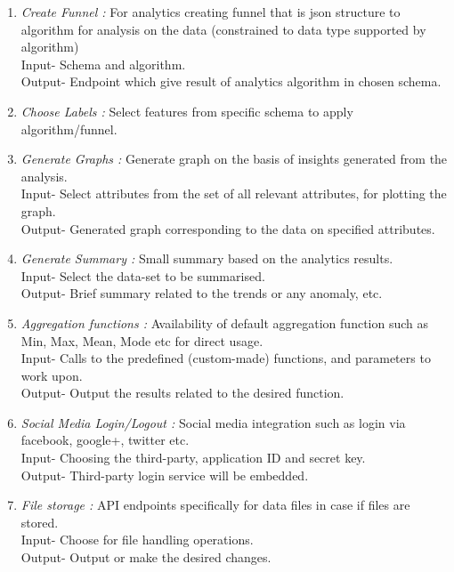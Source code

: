 \documentclass[a4paper,12pt]{report}
\begin{document}
\begin{enumerate}
{        Input- Select import file and its file format. \\
        Output- Data imported according to file format in schema.
      }
      \item {\emph {Create Funnel :}   For analytics creating funnel that is json structure to algorithm for analysis on the data (constrained to data type supported by algorithm) \\
        Input- Schema and algorithm. \\
        Output- Endpoint which give result of analytics algorithm in chosen schema.  
      }
      \item { \emph {Choose Labels :} Select features from specific schema to apply algorithm/funnel. }
      \item {\emph {Generate Graphs :}   Generate graph on the basis of insights generated from the analysis. \\
        Input- Select attributes from the set of all relevant attributes, for plotting the graph.\\
        Output- Generated graph corresponding to the data on specified attributes.
      }
      \item {\emph {Generate Summary :}    Small summary based on the analytics results. \\
      Input- Select the data-set to be summarised.\\
      Output- Brief summary related to the trends or any anomaly, etc.
      }
      \item {\emph {Aggregation functions :} Availability of default aggregation function such as Min, Max, Mean, Mode etc for direct usage. \\
        Input- Calls to the predefined (custom-made) functions, and parameters to work upon. \\
        Output- Output the results related to the desired function.
      }
      \item {\emph {Social Media Login/Logout :} Social media integration such as login via facebook, google+, twitter etc. \\
        Input- Choosing the third-party, application ID and secret key. \\
        Output- Third-party login service will be embedded.
      }
      \item {\emph {File storage : } API endpoints specifically for data files in case if files are stored. \\
        Input- Choose for file handling operations. \\
        Output- Output or make the desired changes.
      }
      \end{enumerate}
\end{document}
